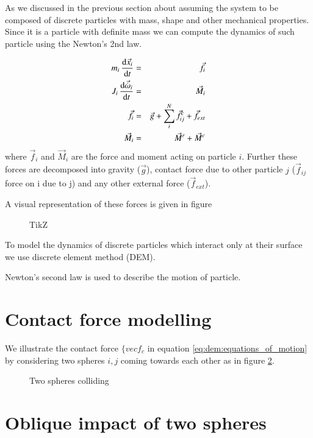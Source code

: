 As we discussed in the previous section about assuming the system to be composed
of discrete particles with mass, shape and other mechanical properties. Since it
is a particle with definite mass we can compute the dynamics of such particle
using the Newton's 2nd law.


\begin{eqnarray}
  \label{eq:dem:equations_of_motion}
  m_i \, \dv{\vec{x}_i}{t} &=& \vec{f}_i\\
  J_i \, \dv{\vec{\dot{\omega}}_i}{t} &=& \vec{M}_i\\
  \vec{f}_i &=& \vec{g} + \sum_i^N \vec{f}_{ij}^c + \vec{f}_{ext}\\
  \vec{M}_i &=& \vec{M}^r + \vec{M}^c
\end{eqnarray}
where $\vec{f}_i$ and $\vec{M}_i$ are the force and moment acting on particle
$i$. Further these forces are decomposed into gravity ($\vec{g}$), contact force
due to other particle $j$ ($\vec{f}_{ij}$ force on i due to j) and any other external
force ($\vec{f}_{ext}$).

A visual representation of these forces is given in figure

\begin{figure}[htb]
  \centering
  \caption{TikZ}
  \label{fig:}
\end{figure}







To model the dynamics of discrete particles which interact only at their surface
we use discrete element method (DEM).

Newton's second law is used to describe the motion of particle.



\section{Contact force modelling}
\label{sec:cont-force-modell}
We illustrate the contact force $\{vec{f}_c$ in equation
\ref{eq:dem:equations_of_motion} by considering two spheres $i, j$ coming
towards each other as in figure \ref{fig:dem:two_spheres_collinding}.

\begin{figure}
  \centering
  \label{fig:dem:two_spheres_collinding}
  \caption{Two spheres colliding}
\end{figure}

\section{Oblique impact of two spheres}
\label{sec:oblique-impact-two}




